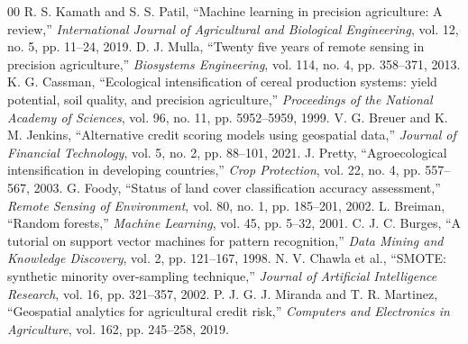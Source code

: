 \documentclass[conference]{IEEEtran}
\begin{document}
\begin{thebibliography}{00}
 R. S. Kamath and S. S. Patil, ``Machine learning in precision agriculture: A review,'' \textit{International Journal of Agricultural and Biological Engineering}, vol. 12, no. 5, pp. 11--24, 2019.
 D. J. Mulla, ``Twenty five years of remote sensing in precision agriculture,'' \textit{Biosystems Engineering}, vol. 114, no. 4, pp. 358--371, 2013.
 K. G. Cassman, ``Ecological intensification of cereal production systems: yield potential, soil quality, and precision agriculture,'' \textit{Proceedings of the National Academy of Sciences}, vol. 96, no. 11, pp. 5952--5959, 1999.
 V. G. Breuer and K. M. Jenkins, ``Alternative credit scoring models using geospatial data,'' \textit{Journal of Financial Technology}, vol. 5, no. 2, pp. 88--101, 2021.
 J. Pretty, ``Agroecological intensification in developing countries,'' \textit{Crop Protection}, vol. 22, no. 4, pp. 557--567, 2003.
 G. Foody, ``Status of land cover classification accuracy assessment,'' \textit{Remote Sensing of Environment}, vol. 80, no. 1, pp. 185--201, 2002.
 L. Breiman, ``Random forests,'' \textit{Machine Learning}, vol. 45, pp. 5--32, 2001.
 C. J. C. Burges, ``A tutorial on support vector machines for pattern recognition,'' \textit{Data Mining and Knowledge Discovery}, vol. 2, pp. 121--167, 1998.
 N. V. Chawla et al., ``SMOTE: synthetic minority over-sampling technique,'' \textit{Journal of Artificial Intelligence Research}, vol. 16, pp. 321--357, 2002.
 P. J. G. J. Miranda and T. R. Martinez, ``Geospatial analytics for agricultural credit risk,'' \textit{Computers and Electronics in Agriculture}, vol. 162, pp. 245--258, 2019.
\end{thebibliography}
\end{document}
